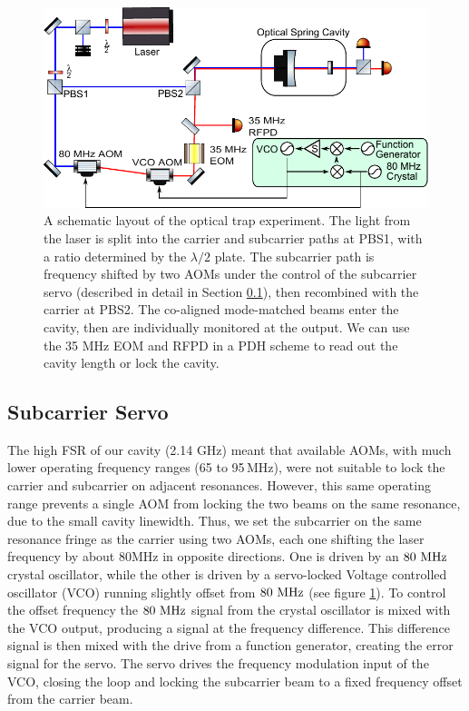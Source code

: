 \begin{figure}[htb]%
\centering
\includegraphics[width=\columnwidth]{figures/photothermal/layout3}%
\caption{A schematic layout of the optical trap experiment. The light from the laser is split into the carrier and subcarrier paths at PBS1, with a ratio determined by the $\lambda/2$ plate. The subcarrier path is frequency shifted by two AOMs under the control of the subcarrier servo (described in detail in Section \ref{sec:subservo}), then recombined with the carrier at PBS2. The co-aligned mode-matched beams enter the cavity, then are individually monitored at the output. We can use the 35 MHz EOM and RFPD in a PDH scheme to read out the cavity length or lock the cavity.}
\label{fig:layout}
\end{figure}


\subsection{Subcarrier Servo}
\label{sec:subservo}

The high FSR of our cavity (2.14 GHz) meant that available AOMs, with much lower operating frequency ranges (65 to 95$\,$MHz), were not suitable to lock the carrier and subcarrier on adjacent resonances.  
However, this same operating range prevents a single AOM from locking the two beams on the same resonance, due to the small cavity linewidth.
%
%
Thus, we set the subcarrier on the same resonance fringe as the carrier using two AOMs, each one shifting the laser frequency by about 80MHz in opposite directions.
One is driven by an $80~{\rm MHz}$ crystal oscillator, while the other is driven by a servo-locked Voltage controlled oscillator (VCO) running slightly offset from $80~{\rm MHz}$ (see figure \ref{fig:layout}).
To control the offset frequency the $80~{\rm MHz}$ signal from the crystal oscillator is mixed with the VCO output, producing a signal at the frequency difference. This difference signal is then mixed with the drive from a function generator, creating the error signal for the servo.  The servo drives the frequency modulation input of the VCO, closing the loop and locking the subcarrier beam to a fixed frequency offset from the carrier beam.

